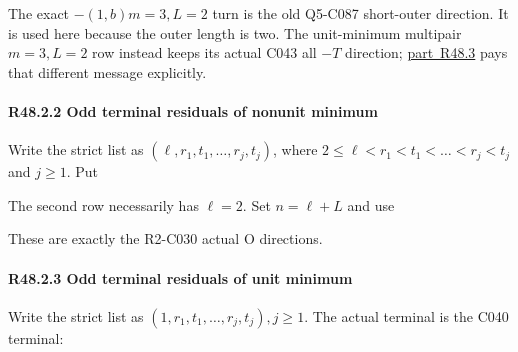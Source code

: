 The exact \(-(1,\allowbreak \allowbreak b) m=3,\allowbreak \allowbreak L=2\) turn is the old Q5-C087 short-outer direction. It is used here because the outer length is two. The unit-minimum multipair \(m=3,\allowbreak \allowbreak L=2\) row instead keeps its actual C043 all \(-T\) direction; \mbox{\hyperref[part:R48.3]{part R48.3}} pays that different message explicitly.

\paragraph{R48.2.2 Odd terminal residuals of nonunit minimum}

Write the strict list as \((\ell,\allowbreak \allowbreak r_1,\allowbreak \allowbreak t_{1},\allowbreak \allowbreak \ldots,\allowbreak \allowbreak r_{j},\allowbreak \allowbreak t_{j})\), where \(2 \le  \ell < r_1 < t_{1} < \ldots < r_{j} < t_{j}\) and \(j \ge  1\). Put


The second row necessarily has \(\ell=2\). Set \(n=\ell+L\) and use


These are exactly the R2-C030 actual O directions.

\paragraph{R48.2.3 Odd terminal residuals of unit minimum}

Write the strict list as \((1,\allowbreak \allowbreak r_1,\allowbreak \allowbreak t_{1},\allowbreak \allowbreak \ldots,\allowbreak \allowbreak r_{j},\allowbreak \allowbreak t_{j}),\allowbreak \allowbreak  j \ge  1\). The actual terminal is the C040 terminal:


